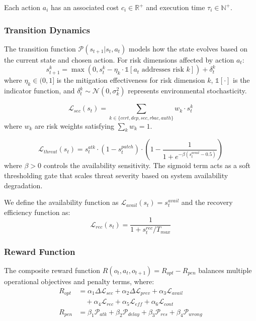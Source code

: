 \documentclass[pdflatex,sn-mathphys-num]{sn-jnl}%
\theoremstyle{thmstyleone}%
\theoremstyle{thmstyletwo}%
\theoremstyle{thmstylethree}%
\begin{document}
	Each action $a_i$ has an associated cost $c_i \in \mathbb{R}^+$ and execution time $\tau_i \in \mathbb{N}^+$.
	
	\subsubsection{Transition Dynamics}
	
	The transition function $\mathcal{P}(s_{t+1} | s_t, a_t)$ models how the state evolves based on the current state and chosen action. For risk dimensions affected by action $a_t$:
	\begin{equation}
		s_{t+1}^{k} = \max\left(0, s_t^{k} - \eta_k \cdot \mathbb{1}[a_t \text{ addresses risk } k]\right) + \delta_t^{k}
	\end{equation}
	where $\eta_k \in (0, 1]$ is the mitigation effectiveness for risk dimension $k$, $\mathbb{1}[\cdot]$ is the indicator function, and $\delta_t^{k} \sim \mathcal{N}(0, \sigma_k^2)$ represents environmental stochasticity.
	
	\begin{equation}
		\mathcal{L}_{sec}(s_t) = \sum_{k \in \{cert, dep, sec, rbac, auth\}} w_k \cdot s_t^{k}
	\end{equation}
	where $w_k$ are risk weights satisfying $\sum_k w_k = 1$.
	
	\begin{equation}
		\mathcal{L}_{threat}(s_t) = s_t^{atk} \cdot \left(1 - s_t^{patch}\right) \cdot \left(1 - \frac{1}{1 + e^{-\beta(s_t^{avail} - 0.5)}}\right)
	\end{equation}
	where $\beta > 0$ controls the availability sensitivity. The sigmoid term acts as a soft thresholding gate that scales threat severity based on system availability degradation.
	
	We define the availability function as $\mathcal{L}_{avail}(s_t) = s_t^{avail}$ and the recovery efficiency function as:
	\begin{equation}
		\mathcal{L}_{rec}(s_t) = \frac{1}{1 + s_t^{rec}/T_{max}}
	\end{equation}
	
	\subsubsection{Reward Function}
	
	The composite reward function $R(o_t, a_t, o_{t+1}) = R_{opt} - R_{pen}$ balances multiple operational objectives and penalty terms, where:
	\begin{align}
		R_{opt} &= \alpha_1 \Delta\mathcal{L}_{sec} + \alpha_2 \Delta\mathcal{L}_{prev} + \alpha_3 \mathcal{L}_{avail} \nonumber \\
		&\quad + \alpha_4 \mathcal{L}_{rec} + \alpha_5 \mathcal{L}_{eff} + \alpha_6 \mathcal{L}_{cont} \\
		R_{pen} &= \beta_1 \mathcal{P}_{atk} + \beta_2 \mathcal{P}_{delay} + \beta_3 \mathcal{P}_{res} + \beta_4 \mathcal{P}_{wrong}
	\end{align}
	
\end{document}
